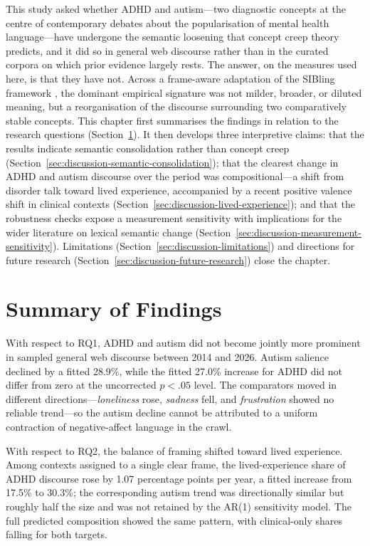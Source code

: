 This study asked whether ADHD and autism---two diagnostic concepts at the centre of contemporary debates about the popularisation of mental health language---have undergone the semantic loosening that concept creep theory predicts, and it did so in general web discourse rather than in the curated corpora on which prior evidence largely rests. The answer, on the measures used here, is that they have not. Across a frame-aware adaptation of the SIBling framework \citep{baesMultidimensionalFrameworkEvaluating2024}, the dominant empirical signature was not milder, broader, or diluted meaning, but a reorganisation of the discourse surrounding two comparatively stable concepts. This chapter first summarises the findings in relation to the research questions (Section~\ref{sec:discussion-summary}). It then develops three interpretive claims: that the results indicate semantic consolidation rather than concept creep (Section~\ref{sec:discussion-semantic-consolidation}); that the clearest change in ADHD and autism discourse over the period was compositional---a shift from disorder talk toward lived experience, accompanied by a recent positive valence shift in clinical contexts (Section~\ref{sec:discussion-lived-experience}); and that the robustness checks expose a measurement sensitivity with implications for the wider literature on lexical semantic change (Section~\ref{sec:discussion-measurement-sensitivity}). Limitations (Section~\ref{sec:discussion-limitations}) and directions for future research (Section~\ref{sec:discussion-future-research}) close the chapter.

\section{Summary of Findings}
\label{sec:discussion-summary}

With respect to RQ1, ADHD and autism did not become jointly more prominent in sampled general web discourse between 2014 and 2026. Autism salience declined by a fitted 28.9\%, while the fitted 27.0\% increase for ADHD did not differ from zero at the uncorrected \(p < .05\) level. The comparators moved in different directions---\textit{loneliness} rose, \textit{sadness} fell, and \textit{frustration} showed no reliable trend---so the autism decline cannot be attributed to a uniform contraction of negative-affect language in the crawl.

With respect to RQ2, the balance of framing shifted toward lived experience. Among contexts assigned to a single clear frame, the lived-experience share of ADHD discourse rose by 1.07 percentage points per year, a fitted increase from 17.5\% to 30.3\%; the corresponding autism trend was directionally similar but roughly half the size and was not retained by the AR(1) sensitivity model. The full predicted composition showed the same pattern, with clinical-only shares falling for both targets.

